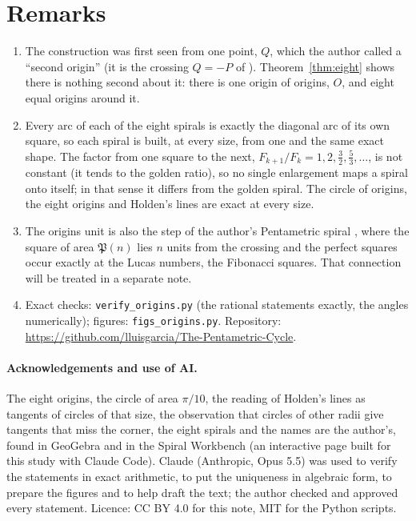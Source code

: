 \documentclass[11pt,a4paper]{article}
\theoremstyle{plain}
\theoremstyle{definition}
\theoremstyle{remark}
\begin{document}
\section{Remarks}

\begin{enumerate}[leftmargin=*,itemsep=0pt,topsep=2pt]
\item The construction was first seen from one point, $Q$, which the author called a ``second origin'' (it is the crossing $Q=-P$ of \cite{rhombus}). Theorem~\ref{thm:eight} shows there is nothing second about it: there is one origin of origins, $O$, and eight equal origins around it.
\item Every arc of each of the eight spirals is exactly the diagonal arc of its own square, so each spiral is built, at every size, from one and the same exact shape. The factor from one square to the next, $F_{k+1}/F_k = 1, 2, \tfrac32, \tfrac53, \dots$, is not constant (it tends to the golden ratio), so no single enlargement maps a spiral onto itself; in that sense it differs from the golden spiral. The circle of origins, the eight origins and Holden's lines are exact at every size.
\item The origins unit is also the step of the author's Pentametric spiral \cite{gt}, where the square of area $\mathfrak{P}(n)$ lies $n$ units from the crossing and the perfect squares occur exactly at the Lucas numbers, the Fibonacci squares. That connection will be treated in a separate note.
\item Exact checks: \texttt{verify\_origins.py} (the rational statements exactly, the angles numerically); figures: \texttt{figs\_origins.py}. Repository:\\ \url{https://github.com/lluisgarcia/The-Pentametric-Cycle}.
\end{enumerate}

\paragraph{Acknowledgements and use of AI.} The eight origins, the circle of area $\pi/10$, the reading of Holden's lines as tangents of circles of that size, the observation that circles of other radii give tangents that miss the corner, the eight spirals and the names are the author's, found in GeoGebra and in the Spiral Workbench (an interactive page built for this study with Claude Code). Claude (Anthropic, Opus 5.5) was used to verify the statements in exact arithmetic, to put the uniqueness in algebraic form, to prepare the figures and to help draft the text; the author checked and approved every statement. Licence: CC BY 4.0 for this note, MIT for the Python scripts.
\end{document}
